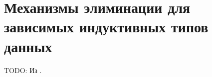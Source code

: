 \section{Механизмы элиминации для зависимых индуктивных типов данных}

TODO: Из \cite{the-view-from-the-left}.
